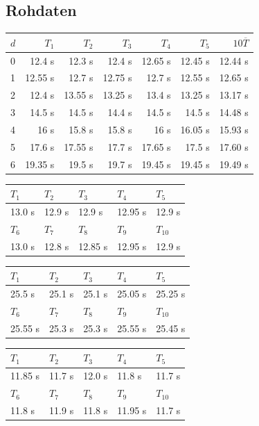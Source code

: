 \documentclass[12pt,a4paper]{article}
\begin{document}
\subsection*{Rohdaten}

\begin{tabular}{|l|r|r|r|r|r|r|}
\hline
$d$&$T_1$&$T_2$&$T_3$&$T_4$&$T_5$&$10\overline{T}$\\
\hline
0&12.4 s&12.3 s&12.4 s&12.65 s&12.45 s&12.44 s\\
1&12.55 s&12.7 s&12.75 s&12.7 s&12.55 s&12.65 s\\
2&12.4 s&13.55 s&13.25 s&13.4 s&13.25 s&13.17 s\\
3&14.5 s&14.5 s&14.4 s&14.5 s&14.5 s&14.48 s\\
4&16 s&15.8 s&15.8 s&16 s&16.05 s&15.93 s\\
5&17.6 s&17.55 s&17.7 s&17.65 s&17.5 s&17.60 s\\
6&19.35 s&19.5 s&19.7 s&19.45 s&19.45 s&19.49 s\\
\hline
\end{tabular}

\begin{tabular}{|l|l|l|l|l|}
\hline
$T_{1}$&$T_{2}$&$T_{3}$&$T_{4}$&$T_{5}$\\
\hline
13.0 s&12.9 s&12.9 s&12.95 s&12.9 s\\
\hline
\hline
$T_{6}$&$T_{7}$&$T_{8}$&$T_{9}$&$T_{10}$\\
\hline
13.0 s&12.8 s&12.85 s&12.95 s&12.9 s\\
\hline
\end{tabular}

\begin{tabular}{|l|l|l|l|l|}
\hline
$T_{1}$&$T_{2}$&$T_{3}$&$T_{4}$&$T_{5}$\\
\hline
25.5 s&25.1 s&25.1 s&25.05 s&25.25 s\\
\hline
\hline
$T_{6}$&$T_{7}$&$T_{8}$&$T_{9}$&$T_{10}$\\
\hline
25.55 s&25.3 s&25.3 s&25.55 s&25.45 s\\
\hline
\end{tabular}

\begin{tabular}{|l|l|l|l|l|}
\hline
$T_{1}$&$T_{2}$&$T_{3}$&$T_{4}$&$T_{5}$\\
\hline
11.85 s&11.7 s&12.0 s&11.8 s&11.7 s\\
\hline
\hline
$T_{6}$&$T_{7}$&$T_{8}$&$T_{9}$&$T_{10}$\\
\hline
11.8 s&11.9 s&11.8 s&11.95 s&11.7 s\\
\hline
\end{tabular}
\end{document}

